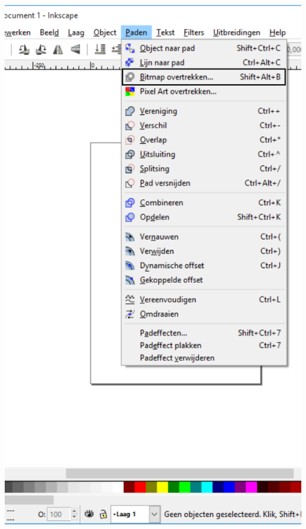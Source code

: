 \documentclass[t]{beamer}
\begin{document}
\begin{frame}
{\begin{columns}
\begin{column}[T]{0.4\textwidth}
					\includegraphics[height=0.8\textheight]{fig/inkscape_bitmap_overtrekken}
				\end{column}
			\end{columns}
		}
\end{frame}
\end{document}

